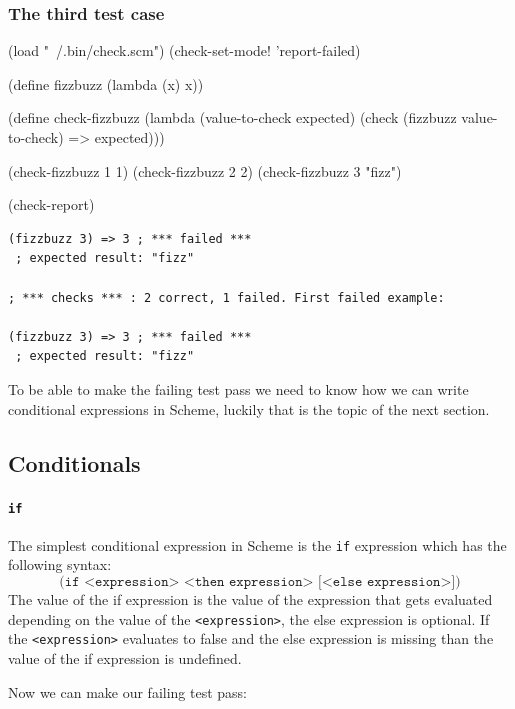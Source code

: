 \documentclass[12pt,a4paper,english,twoside]{article}
\begin{document}
\subsubsection{The third test case}
\begin{schemecode}
(load "~/.bin/check.scm")
(check-set-mode! 'report-failed)

(define fizzbuzz (lambda (x) x))

(define check-fizzbuzz 
  (lambda (value-to-check expected)
    (check (fizzbuzz value-to-check) => expected)))

(check-fizzbuzz 1 1)
(check-fizzbuzz 2 2)
(check-fizzbuzz 3 "fizz")

(check-report)
\end{schemecode}
\begin{lstlisting}
(fizzbuzz 3) => 3 ; *** failed ***
 ; expected result: "fizz"

; *** checks *** : 2 correct, 1 failed. First failed example:

(fizzbuzz 3) => 3 ; *** failed ***
 ; expected result: "fizz"
\end{lstlisting}

To be able to make the failing test pass we need to know how we can write 
conditional expressions in Scheme, luckily that is the topic of the next 
section.

\subsection{Conditionals}
\paragraph{\texttt{if}}
The simplest conditional expression in Scheme is the \texttt{if} expression 
which
has the following syntax:
\begin{equation*}
    \texttt{(if <expression> <then expression> [<else expression>])}
\end{equation*}
The value of the if expression is the value of the expression that gets 
evaluated depending on the value of the \texttt{<expression>}, the else 
expression is optional. If the \texttt{<expression>} evaluates to false and 
the else expression is missing than the value of the if expression is 
undefined.

Now we can make our failing test pass:
\end{document}
